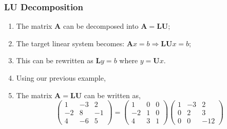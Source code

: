 \documentclass[10pt,compress]{beamer}
\begin{document}
\begin{frame}
  \frametitle{LU Decomposition} 
  \begin{enumerate}
     \item <1-> The matrix $\bm{A}$ can be decomposed into $\bm{A}=\bm{L}\bm{U}$;
     \item <2-> The target linear system becomes: $\bm{A}x=b \Longrightarrow \bm{L}\bm{U}x=b$;
     \item <3-> This can be rewritten as $\bm{L}y=b$ where $y=\bm{U}x$.
     \item <4-> Using our previous example,
     \item <5-> The matrix $\bm{A}=\bm{L}\bm{U}$ can be written as,
          \begin{displaymath}
             \begin{pmatrix}
                1 & -3 & 2 \\ -2 & 8 & -1 \\ 4 & -6 & 5
             \end{pmatrix}=
             \begin{pmatrix}
                1 & 0 & 0 \\ -2 & 1 & 0 \\ 4 & 3 & 1
             \end{pmatrix}
             \begin{pmatrix}
                1 & -3 & 2 \\ 0 & 2 & 3 \\ 0 & 0 & -12
             \end{pmatrix}
          \end{displaymath}
  \end{enumerate}
\end{frame}
\end{document}
